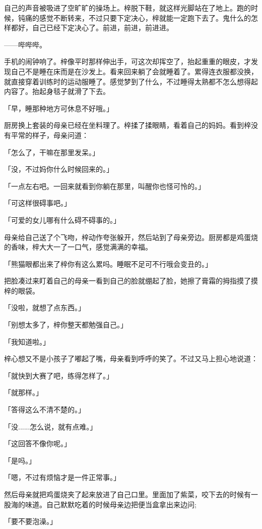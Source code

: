 \documentclass[UTF8]{ctexart}
\begin{document}
    自己的声音被吸进了空旷旷的操场上。梓脱下鞋，就这样光脚站在了地上。跑的时候，钝痛的感觉不断转来，不过只要下定决心，梓就能一定跑下去了。鬼什么的怎样都好，自己已经下定决心了。前进，前进，前进进。

    ——哔哔哔。

    手机的闹钟响了。梓像平时那样伸出手，可这次却挥空了，抬起重重的眼皮，才发现自己不是睡在床而是在沙发上。看来回来躺了会就睡着了。累得连衣服都没换，就直接穿着训练时的运动服睡了。感觉梦到了什么，不过睡得太熟都不怎么想得起内容了。抬起身毯子就滑了下去。

    「早，睡那种地方可休息不好哦。」

    厨房换上套装的母亲已经在坐料理了。梓揉了揉眼睛，看着自己的妈妈。看到梓没有平常的样子，母亲问道：

    「怎么了，干嘛在那里发呆。」

    「没，不过妈你什么时候回来的。」

    「一点左右吧。一回来就看到你躺在那里，叫醒你也怪可怜的。」

    「可这样很碍事吧。」

    「可爱的女儿哪有什么碍不碍事的。」

    母亲给自己送了个飞吻，梓动作夸张躲开，然后站到了母亲旁边。厨房都是鸡蛋烧的香味，梓大大一了一口气，感觉满满的幸福。

    「熊猫眼都出来了梓你有这么累吗。睡眠不足可不行哦会变丑的。」

    把脸凑过来盯着自己的母亲一看到自己的脸就绷起了脸，她擦了膏霜的拇指摸了摸梓的眼袋。

    「没啦，就想了点东西。」

    「别想太多了，梓你整天都勉强自己。」

    「我知道啦。」

    梓心想又不是小孩子了嘟起了嘴，母亲看到呼呼的笑了。不过又马上担心地说道：

    「就快到大赛了吧，练得怎样了。」

    「就那样。」

    「答得这么不清不楚的。」

    「没......怎么说，就有点难。」

    「这回答不像你呢。」

    「是吗。」

    「嗯，不过有烦恼才是一件正常事。」

    然后母亲就把鸡蛋烧夹了起来放进了自己口里。里面加了紫菜，咬下去的时候有一股海的味道。自己默默吃着的时候母亲边把便当盒拿出来边问;

    「要不要泡澡。」
\end{document}
